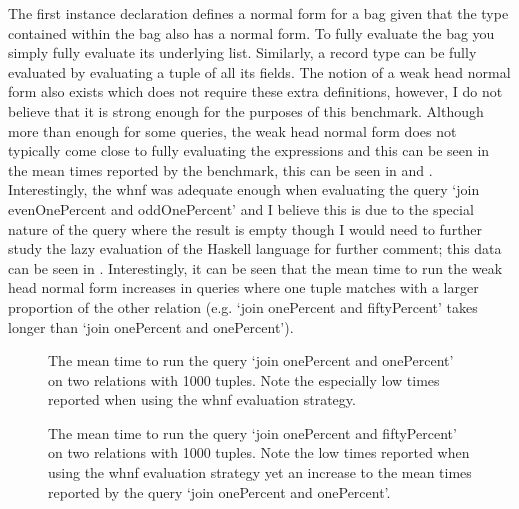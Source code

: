 \noindent
The first instance declaration defines a normal form for a bag given that the
type contained within the bag also has a normal form. To fully evaluate the bag
you simply fully evaluate its underlying list. Similarly, a record type can be
fully evaluated by evaluating a tuple of all its fields. The notion of a weak
head normal form also exists which does not require these extra definitions,
however, I do not believe that it is strong enough for the purposes of this
benchmark. Although more than enough for some queries, the weak head normal form
does not typically come close to fully evaluating the expressions and this can
be seen in the mean times reported by the benchmark, this can be seen in
and . Interestingly, the whnf was
adequate enough when evaluating the query `join evenOnePercent and
oddOnePercent' and I believe this is due to the special nature of the query
where the result is empty though I would need to further study the lazy
evaluation of the Haskell language for further comment; this data can be seen in
.
Interestingly, it can be seen that the mean time to run the weak head normal
form increases in queries where one tuple matches with a larger proportion of
the other relation (e.g. `join onePercent and fiftyPercent' takes longer than
`join onePercent and onePercent'). 

\begin{figure}[p]
    \centering
    
    \caption{The mean time to run the query `join onePercent and onePercent' on
    two relations with 1000 tuples. Note the especially low times reported when
using the whnf evaluation strategy.}
    \label{fig:evaluation:nf-whnf-join-onePercent-and-onePercent}
\end{figure}

\begin{figure}[p]
    \centering
    
    \caption{The mean time to run the query `join onePercent and fiftyPercent' on
    two relations with 1000 tuples. Note the low times reported when
using the whnf evaluation strategy yet an increase to the mean times reported by
the query `join onePercent and onePercent'.}
    \label{fig:evaluation:nf-whnf-join-onePercent-and-fiftyPercent}
\end{figure}

